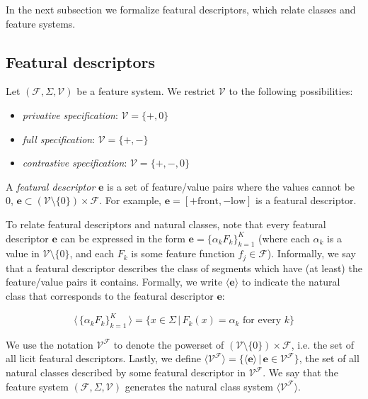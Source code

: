 \documentclass[11pt, oneside]{article}   	%
\begin{document}
\noindent In the next subsection we formalize featural descriptors, which relate classes and feature systems.

\subsection{Featural descriptors}

Let $(\mathcal F, \Sigma, \mathcal V)$ be a feature system. We restrict $\mathcal V$ to the following possibilities: \begin{itemize}
    \item \textit{privative specification}: $\mathcal V = \{ +, 0 \}$
    \item \textit{full specification}: $\mathcal V = \{ +, - \}$
    \item \textit{contrastive specification}: $\mathcal V = \{ +, -, 0 \}$
    \end{itemize}

A \textit{featural descriptor} $\mathbf{e}$ is a set of feature/value pairs where the values cannot be $0$, $\mathbf{e} \subset (\mathcal V \setminus \{0\}) \times \mathcal F$. For example, $\mathbf{e} = [+ \text{front}, - \text{low}]$ is a featural descriptor.

To relate featural descriptors and natural classes, note that every featural descriptor $\mathbf{e}$ can be expressed in the form $\mathbf{e} = \{\alpha_k F_k\}_{k=1}^K$ (where each $\alpha_k$ is a value in $\mathcal V \setminus \{ 0 \}$, and each $F_k$ is some feature function $f_j \in \mathcal F$). Informally, we say that a featural descriptor describes the class of segments which have (at least) the feature/value pairs it contains. Formally, we write $\langle \mathbf{e} \rangle$ to indicate the natural class that corresponds to the featural descriptor $\mathbf{e}$:

$$ \langle \, \{\alpha_k F_k\}_{k=1}^K \, \rangle = \{x \in \Sigma \, | \, F_k(x) = \alpha_k \text{ for every } k \} $$

\vspace{\baselineskip} \noindent We use the notation $\mathcal V^\mathcal F$ to denote the powerset of $(\mathcal V \setminus \{0\}) \times \mathcal F$, i.e. the set of all licit featural descriptors. Lastly, we define $\langle \mathcal V^\mathcal F \rangle = \{ \langle \mathbf{e} \rangle \, | \, \mathbf{e} \in \mathcal V^\mathcal F \}$, the set of all natural classes described by some featural descriptor in $\mathcal V^\mathcal F$. We say that the feature system $(\mathcal F, \Sigma, \mathcal V)$ generates the natural class system $\langle \mathcal V^\mathcal F \rangle$.
\end{document}
